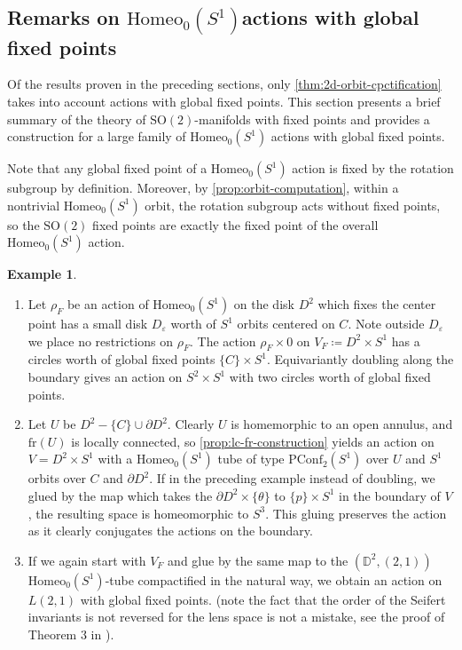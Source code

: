 \documentclass[10pt, oneside]{article}
\newcommand{\D}{\mathbb{D}}
\newcommand{\SO}[1][2]{\text{SO}(#1)}
\newcommand{\homeo}[1][S^1]{\text{Homeo}_0(#1)}
\newcommand{\pconf}[2][S^1]{\text{PConf}_{#2}(#1)}
\newcommand{\fr}[1]{\text{fr}(#1)}
\newcommand{\titlesafehomeo}{\texorpdfstring{$\homeo$}{Homeo\_0(S\string^ 1)}}
\theoremstyle{definition}
\newtheorem{eg}{Example}[section]
\theoremstyle{definition}
\begin{document}
\subsection{Remarks on \titlesafehomeo actions with global fixed points}\label{subsec:fixed-points} 
Of the results proven in the preceding sections, only \cref{thm:2d-orbit-cpctification} takes into account actions with global fixed points. This section presents a brief summary of the theory of $\SO$-manifolds with fixed points and provides a construction for a large family of $\homeo$ actions with global fixed points. 

Note that any global fixed point of a $\homeo$ action is fixed by the rotation subgroup by definition. Moreover, by \cref{prop:orbit-computation}, within a nontrivial $\homeo$ orbit, the rotation subgroup acts without fixed points, so the $\SO$ fixed points are exactly the fixed point of the overall $\homeo$ action. 

\begin{eg}\leavevmode
    \begin{enumerate}
        \item Let $\rho_F$ be an action of $\homeo$ on the disk $D^2$ which fixes the center point has a small disk $D_\varepsilon$ worth of $S^1$ orbits centered on $C$. Note outside $D_\varepsilon$ we place no restrictions on $\rho_F$. The action $\rho_F \times 0$ on $V_F \coloneqq D^2\times S^1$ has a circles worth of global fixed points $\{C\}\times S^1$. Equivariantly doubling along the boundary gives an action on $S^2\times S^1$ with two circles worth of global fixed points.

        \item Let $U$ be $D^2 - \{C\}\cup\partial D^2$. Clearly $U$ is homemorphic to an open annulus, and $\fr{U}$ is locally connected, so \cref{prop:lc-fr-construction} yields an action on $V= D^2\times S^1$ with a $\homeo$ tube of type $\pconf{2}$ over $U$ and $S^1$ orbits over $C$ and $\partial D^2$. If in the preceding example instead of doubling, we glued by the map which takes the $\partial D^2 \times \{\theta\}$ to $\{p\}\times S^1$ in the boundary of $V$, the resulting space is homeomorphic to $S^3$. This gluing preserves the action as it clearly conjugates the actions on the boundary.
        
        \item If we again start with $V_F$ and glue by the same map to the $(\D^2, (2,1))$ $\homeo$-tube compactified in the natural way, we obtain an action on $L(2, 1)$ with global fixed points. (note the fact that the order of the Seifert invariants is not reversed for the lens space is not a mistake, see the proof of Theorem 3 in \cite{orlik:ActionsSO2}).
    \end{enumerate}
\end{eg}
\end{document}
